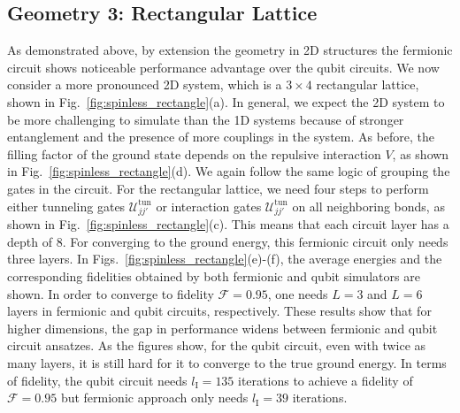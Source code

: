 \documentclass[aps, pra, reprint, superscriptaddress]{revtex4-1}
\begin{document}
\subsection{Geometry 3: Rectangular Lattice}
\label{subsec:spinless_2d}
As demonstrated above, by extension the geometry in 2D structures the fermionic circuit shows noticeable performance advantage over the qubit circuits.  We now consider a more pronounced  2D system, which is a $3{\times} 4$ rectangular lattice, shown in  Fig.~\ref{fig:spinless_rectangle}(a). In general, we expect the 2D system to be more challenging to simulate than the 1D systems because of stronger entanglement and the presence of more couplings in the system.
As before, the filling factor of the ground state depends on the repulsive interaction $V$, as shown in Fig.~\ref{fig:spinless_rectangle}(d).  We again follow the same logic of grouping the gates in the circuit. For the rectangular lattice, we need four steps to perform either tunneling gates $\mathcal{U}^{\text{tun}}_{jj'}$ or interaction gates $\mathcal{U}^{\text{tun}}_{jj'}$ on all neighboring bonds, as shown in Fig.~\ref{fig:spinless_rectangle}(c). This means that each circuit layer has a depth of $8$. For converging to the ground energy, this fermionic circuit only needs three layers. 
In Figs.~\ref{fig:spinless_rectangle}(e)-(f), the average energies and the corresponding fidelities obtained by both fermionic and qubit simulators are shown. In order to converge to fidelity $\mathcal{F}{=}0.95$, one needs $L{=}3$ and $L{=}6$ layers in fermionic and qubit circuits, respectively. 
These results show that for higher dimensions, the gap in performance widens between fermionic and qubit circuit ansatzes.
As the figures show, for the qubit circuit, even with twice as many layers, it is still hard for it to converge to the true ground energy. In terms of fidelity, the qubit circuit needs $l_\text{I}{=}135$ iterations to achieve a fidelity of $\mathcal{F}{=}0.95$ but fermionic approach only needs $l_\text{I}{=}39$ iterations. 

\end{document}
